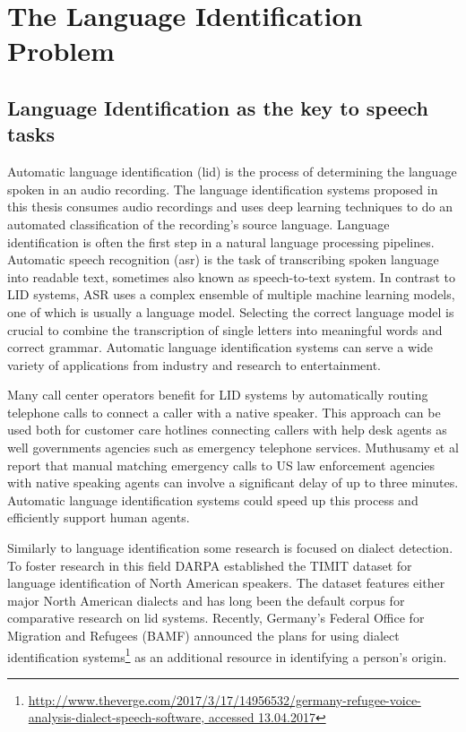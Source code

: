 \section{The Language Identification Problem}
\label{sec:lid}

\subsection{Language Identification as the key to speech tasks}

Automatic language identification (\ac{lid}) is the process of determining the language spoken in an audio recording. The language identification systems proposed in this thesis consumes audio recordings and uses deep learning techniques to do an automated classification of the recording's source language.
Language identification is often the first step in a natural language processing pipelines. Automatic speech recognition (\ac{asr}) is the task of transcribing spoken language into readable text, sometimes also known as speech-to-text system. In contrast to LID systems, ASR uses a complex ensemble of multiple machine learning models, one of which is usually a language model. Selecting the correct language model is crucial to combine the transcription of single letters into meaningful words and correct grammar.
Automatic language identification systems can serve a wide variety of applications from industry and research to entertainment. 

Many call center operators benefit for LID systems by automatically routing telephone calls to connect a caller with a native speaker. This approach can be used both for customer care hotlines connecting callers with help desk agents as well governments agencies such as emergency telephone services. Muthusamy et al\cite{muthusamy1994reviewing} report that manual matching emergency calls to US law enforcement agencies with native speaking agents can involve a significant delay of up to three minutes. Automatic language identification systems could speed up this process and efficiently support human agents.

Similarly to language identification some research is focused on dialect detection. To foster research in this field DARPA established the TIMIT\cite{garofolo1993darpa} dataset for language identification of North American speakers. The dataset features either major North American dialects and has long been the default corpus for comparative research on lid systems.
Recently, Germany's Federal Office for Migration and Refugees (BAMF) announced the plans for using dialect identification systems\footnote{\url{http://www.theverge.com/2017/3/17/14956532/germany-refugee-voice-analysis-dialect-speech-software, accessed 13.04.2017}} as an additional resource in identifying a person's origin.

